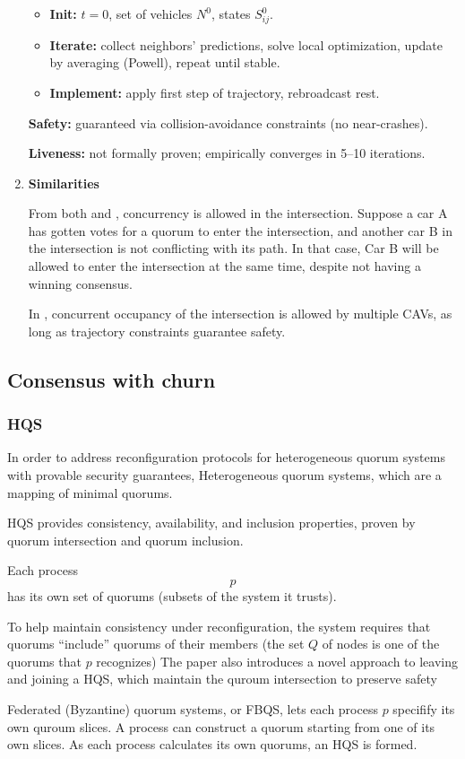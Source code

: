 \documentclass[fleqn,10pt]{olplainarticle}
\begin{document}
\begin{enumerate}
\begin{itemize}
    \item \textbf{Init:} $t=0$, set of vehicles $N^0$, states $S_{ij}^0$.
    \item \textbf{Iterate:} collect neighbors’ predictions, solve local optimization, update by averaging (Powell), repeat until stable.
    \item \textbf{Implement:} apply first step of trajectory, rebroadcast rest.
\end{itemize}

\textbf{Safety:} guaranteed via collision-avoidance constraints (no near-crashes).  

\textbf{Liveness:} not formally proven; empirically converges in 5--10 iterations.



\item 
\textbf{Similarities}

From both \cite{inproceedings} and \cite{lee2025distributedconsensusalgorithmprioritizing}, concurrency is allowed in the intersection. Suppose a car A has gotten votes for a quorum to enter the intersection, and another car B in the intersection is not conflicting with its path. In that case, Car B will be allowed to enter the intersection at the same time, despite not having a winning consensus. 

In \cite{MIRHELI2019161}, concurrent occupancy of the intersection is allowed by multiple CAVs, as long as trajectory constraints guarantee safety.


\end{enumerate}

\subsection{Consensus with churn}

\subsubsection{HQS}

In order to address reconfiguration protocols for heterogeneous quorum systems with provable security guarantees, \cite{HQS}
Heterogeneous quorum systems, which are a mapping of minimal quorums. 

HQS provides consistency, availability, and inclusion properties, proven by quorum intersection and quorum inclusion.

Each process $$p$$ has its own set of quorums (subsets of the system it trusts).


 To help maintain consistency under reconfiguration, the system requires that quorums “include” quorums of their members (the set $Q$ of nodes is one of the quorums that $p$ recognizes)
The paper also introduces a novel approach to leaving and joining a HQS, which maintain the quroum intersection to preserve safety 


Federated (Byzantine) quorum systems, or FBQS, lets each process $p$ specifify its own quroum slices. A process can construct a quorum starting from one
of its own slices. As each process calculates its own quorums, an HQS is formed. 
 




\end{document}
